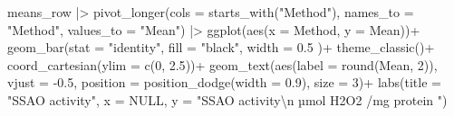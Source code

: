\documentclass[
  letterpaper,
  DIV=11,
  numbers=noendperiod]{scrreprt}
\newenvironment{Shaded}{\begin{snugshade}}{\end{snugshade}}
\newcommand{\AttributeTok}[1]{\textcolor[rgb]{0.40,0.45,0.13}{#1}}
\newcommand{\ConstantTok}[1]{\textcolor[rgb]{0.56,0.35,0.01}{#1}}
\newcommand{\DecValTok}[1]{\textcolor[rgb]{0.68,0.00,0.00}{#1}}
\newcommand{\FloatTok}[1]{\textcolor[rgb]{0.68,0.00,0.00}{#1}}
\newcommand{\FunctionTok}[1]{\textcolor[rgb]{0.28,0.35,0.67}{#1}}
\newcommand{\NormalTok}[1]{\textcolor[rgb]{0.00,0.23,0.31}{#1}}
\newcommand{\SpecialCharTok}[1]{\textcolor[rgb]{0.37,0.37,0.37}{#1}}
\newcommand{\StringTok}[1]{\textcolor[rgb]{0.13,0.47,0.30}{#1}}
\begin{document}
\begin{Shaded}
\begin{Highlighting}[]
\NormalTok{means\_row }\SpecialCharTok{|\textgreater{}} \FunctionTok{pivot\_longer}\NormalTok{(}\AttributeTok{cols =} \FunctionTok{starts\_with}\NormalTok{(}\StringTok{"Method"}\NormalTok{),}
                          \AttributeTok{names\_to =} \StringTok{"Method"}\NormalTok{,}
                          \AttributeTok{values\_to =} \StringTok{"Mean"}\NormalTok{) }\SpecialCharTok{|\textgreater{}} 
  \FunctionTok{ggplot}\NormalTok{(}\FunctionTok{aes}\NormalTok{(}\AttributeTok{x =}\NormalTok{ Method, }\AttributeTok{y =}\NormalTok{ Mean))}\SpecialCharTok{+}
  \FunctionTok{geom\_bar}\NormalTok{(}\AttributeTok{stat =} \StringTok{"identity"}\NormalTok{, }\AttributeTok{fill =} \StringTok{"black"}\NormalTok{, }\AttributeTok{width =} \FloatTok{0.5}
\NormalTok{           )}\SpecialCharTok{+} \FunctionTok{theme\_classic}\NormalTok{()}\SpecialCharTok{+}
  \FunctionTok{coord\_cartesian}\NormalTok{(}\AttributeTok{ylim =} \FunctionTok{c}\NormalTok{(}\DecValTok{0}\NormalTok{, }\FloatTok{2.5}\NormalTok{))}\SpecialCharTok{+}
  \FunctionTok{geom\_text}\NormalTok{(}\FunctionTok{aes}\NormalTok{(}\AttributeTok{label =} \FunctionTok{round}\NormalTok{(Mean, }\DecValTok{2}\NormalTok{)),}
    \AttributeTok{vjust =} \SpecialCharTok{{-}}\FloatTok{0.5}\NormalTok{,}
    \AttributeTok{position =} \FunctionTok{position\_dodge}\NormalTok{(}\AttributeTok{width =} \FloatTok{0.9}\NormalTok{),}
    \AttributeTok{size =} \DecValTok{3}\NormalTok{)}\SpecialCharTok{+}
  \FunctionTok{labs}\NormalTok{(}\AttributeTok{title =} \StringTok{"SSAO activity"}\NormalTok{,}
       \AttributeTok{x =} \ConstantTok{NULL}\NormalTok{,}
       \AttributeTok{y =} \StringTok{"SSAO activity}\SpecialCharTok{\textbackslash{}n}\StringTok{ µmol H2O2 /mg protein "}\NormalTok{)}
\end{Highlighting}
\end{Shaded}
\end{document}
